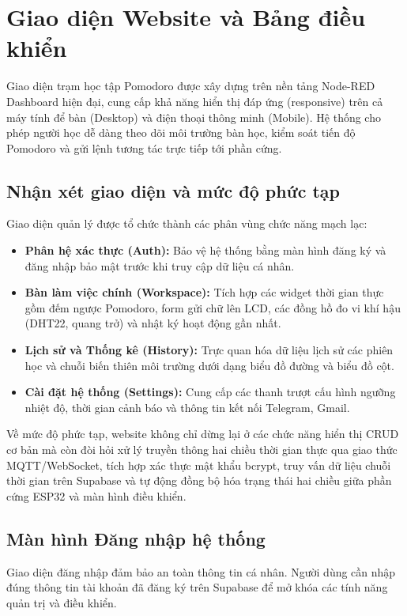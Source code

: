 \section{Giao diện Website và Bảng điều khiển}

Giao diện trạm học tập Pomodoro được xây dựng trên nền tảng Node-RED Dashboard hiện đại, cung cấp khả năng hiển thị đáp ứng (responsive) trên cả máy tính để bàn (Desktop) và điện thoại thông minh (Mobile). Hệ thống cho phép người học dễ dàng theo dõi môi trường bàn học, kiểm soát tiến độ Pomodoro và gửi lệnh tương tác trực tiếp tới phần cứng.

\subsection{Nhận xét giao diện và mức độ phức tạp}
Giao diện quản lý được tổ chức thành các phân vùng chức năng mạch lạc:
\begin{itemize}
    \item \textbf{Phân hệ xác thực (Auth):} Bảo vệ hệ thống bằng màn hình đăng ký và đăng nhập bảo mật trước khi truy cập dữ liệu cá nhân.
    \item \textbf{Bàn làm việc chính (Workspace):} Tích hợp các widget thời gian thực gồm đếm ngược Pomodoro, form gửi chữ lên LCD, các đồng hồ đo vi khí hậu (DHT22, quang trở) và nhật ký hoạt động gần nhất.
    \item \textbf{Lịch sử và Thống kê (History):} Trực quan hóa dữ liệu lịch sử các phiên học và chuỗi biến thiên môi trường dưới dạng biểu đồ đường và biểu đồ cột.
    \item \textbf{Cài đặt hệ thống (Settings):} Cung cấp các thanh trượt cấu hình ngưỡng nhiệt độ, thời gian cảnh báo và thông tin kết nối Telegram, Gmail.
\end{itemize}

Về mức độ phức tạp, website không chỉ dừng lại ở các chức năng hiển thị CRUD cơ bản mà còn đòi hỏi xử lý truyền thông hai chiều thời gian thực qua giao thức MQTT/WebSocket, tích hợp xác thực mật khẩu bcrypt, truy vấn dữ liệu chuỗi thời gian trên Supabase và tự động đồng bộ hóa trạng thái hai chiều giữa phần cứng ESP32 và màn hình điều khiển.

\subsection{Màn hình Đăng nhập hệ thống}
Giao diện đăng nhập đảm bảo an toàn thông tin cá nhân. Người dùng cần nhập đúng thông tin tài khoản đã đăng ký trên Supabase để mở khóa các tính năng quản trị và điều khiển.

